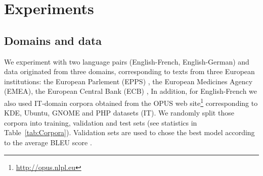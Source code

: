 \documentclass[a4paper]{article}
\DeclareMathOperator*{\argmin}{argmin}
\begin{document}


\section{Experiments \label{sec:experiments}}

\subsection{Domains and data \label{ssec:data}}

We experiment with two language pairs (English-French, English-German) and data originated from three domains, corresponding to texts from three European institutions: 
the European Parlement (EPPS) \cite{Koehn05europarl}, 
the European Medicines Agency (EMEA), 
the European Central Bank (ECB) \cite{Tiedemann09news},
In addition, for English-French we also used IT-domain corpora obtained from the OPUS web site\footnote{\url{http://opus.nlpl.eu}} corresponding to KDE, Ubuntu, GNOME and PHP datasets (IT).
%
We randomly split those corpora into training, validation and test sets (see statistics in Table~\ref{tab:Corpora}).
Validation sets are used to chose the best model according to the average BLEU score \cite{Papineni02bleu}.

\end{document}
